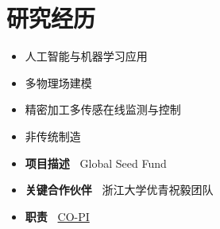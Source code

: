 \documentclass{resume}
\begin{document}


\vspace{5mm}
\section{研究经历}
\begin{itemize}[parsep=0.5ex]
  \item 人工智能与机器学习应用
  \item 多物理场建模
  \item 精密加工多传感在线监测与控制
  \item 非传统制造
\end{itemize}


\label{project:AI4AM}
\begin{itemize}[parsep=0.5ex]
  \item \textbf{项目描述~} Global Seed Fund
  \item \textbf{关键合作伙伴~} 浙江大学优青祝毅团队
  \item \textbf{职责~} \underline{CO-PI}
\end{itemize}
\end{document}

